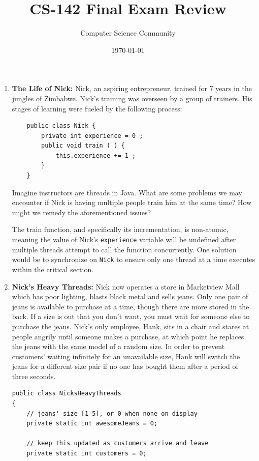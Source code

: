 \documentclass[11pt]{article}
\author{Computer Science Community}
\title{CS-142 Final Exam Review}
\date{\today}
\newenvironment{answer}{\large\lstset{basicstyle=\tiny\ttfamily}\color{white}}{}
\newenvironment{answer}{\large\lstset{basicstyle=\large\ttfamily}\color{red}}{}
\begin{document}
\header

\begin{enumerate}

\item {\bf The Life of Nick:} %
    Nick, an aspiring entrepreneur, trained for 7 years in the jungles of Zimbabwe.
    Nick's training was overseen by a group of trainers. His stages of learning were 
    fueled by the following process:
    \begin{verbatim}
    public class Nick {
        private int experience = 0 ;
        public void train ( ) {
            this.experience += 1 ;
        }
    }\end{verbatim}Imagine instructors are threads in Java. What are some problems
    we may encounter if Nick is having multiple people train him at the same time?
    How might we remedy the aforementioned issues?

    \begin{answer}
    The train function, and specifically its incrementation, is non-atomic, meaning the value of Nick's 
    \texttt{experience} variable will be undefined after multiple threads attempt to call the function concurrently.  One solution would be to synchronize on \texttt{Nick} to ensure only one thread at a time executes within the critical section.
    \end{answer}

\item {\bf Nick's Heavy Threads:} Nick now operates a store in Marketview Mall which
      has poor lighting, blasts black metal and sells jeans. Only one pair of
      jeans is available to purchase at a time, though there are more
      stored in the back. If a size is out that you don't want, you must wait
      for someone else to purchase the jeans. Nick's only employee, Hank, sits
      in a chair and stares at people angrily until someone makes a purchase,
      at which point he replaces the jeans with the same model of a random
      size. In order to prevent customers' waiting infinitely for an
      unavailable size, Hank will switch the jeans for a different size pair if
      no one has bought them after a period of three seconds.

\begin{lstlisting}
public class NicksHeavyThreads
{
	// jeans' size [1-5], or 0 when none on display
    private static int awesomeJeans = 0;
    
	// keep this updated as customers arrive and leave
    private static int customers = 0;
    

\end{lstlisting}
\end{enumerate}
\end{document}
